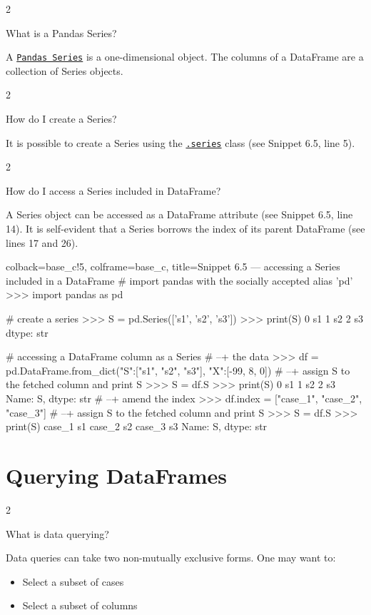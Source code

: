 \documentclass[a4paper,11pt]{book}
\newcommand{\question}[1]{%
    \begin{tcolorbox}[colback=comp_c!10,colframe=comp_c,sidebyside align=top,width=\linewidth,before skip=1ex]
        #1
    \end{tcolorbox}
    \switchcolumn%
}
\newcommand{\note}[1]{%
    \begin{tcolorbox}[colback=white!0,colframe=white!10,width=\linewidth,before skip=1ex]
        #1
    \end{tcolorbox}
}
\begin{document}
\begin{paracol}{2}
	\question{\raggedright What is a Pandas Series?}
	\note{A \href{https://pandas.pydata.org/docs/reference/series.html}{\texttt{Pandas Series}} is a one-dimensional object. The columns of a DataFrame are a collection of Series objects.}
\end{paracol}

\begin{paracol}{2}
	\question{\raggedright How do I create a Series?}
	\note{It is possible to create a Series using the \href{https://pandas.pydata.org/docs/reference/series.html}{\texttt{.series}} class (see Snippet 6.5, line 5).}
\end{paracol}

\begin{paracol}{2}
	\question{\raggedright How do I access a Series included in DataFrame?}
	\note{A Series object can be accessed as a DataFrame attribute (see Snippet 6.5, line 14). It is self-evident that a Series borrows the index of its parent DataFrame (see lines 17 and 26).}
\end{paracol}

\begin{pythoncode}[linenos=True]{colback=base_c!5, colframe=base_c, title=\sffamily Snippet 6.5 --- accessing a Series included in a DataFrame}
# import pandas with the socially accepted alias 'pd'
>>> import pandas as pd

# create a series
>>> S = pd.Series(['s1', 's2', 's3'])
>>> print(S)
0    s1
1    s2
2    s3
dtype: str

# accessing a DataFrame column as a Series
# --+ the data
>>> df = pd.DataFrame.from_dict({"S":["s1", "s2", "s3"], "X":[-99, 8, 0]})
# --+ assign S to the fetched column and print S
>>> S = df.S
>>> print(S)
0    s1
1    s2
2    s3
Name: S, dtype: str
# --+ amend the index
>>> df.index = ["case_1", "case_2", "case_3"]
# --+ assign S to the fetched column and print S
>>> S = df.S
>>> print(S)
case_1    s1
case_2    s2
case_3    s3
Name: S, dtype: str
\end{pythoncode}
\clearpage

\section{Querying DataFrames}
\label{sec:querying_df}

\begin{paracol}{2}
	\question{\raggedright What is data querying?}
	\note{Data queries can take two non-mutually exclusive forms. One may want to:
	
	\begin{itemize}
		\item Select a subset of cases 
		\item Select a subset of columns
	\end{itemize}
	}
\end{paracol}
\end{document}
